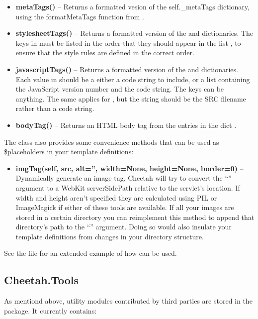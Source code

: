 \begin{itemize}
\item {\bf metaTags()} -- Returns a formatted vesion of the self.\_metaTags
     dictionary, using the formatMetaTags function from
     .
\item {\bf stylesheetTags()} -- Returns a formatted version of the
      and  dictionaries.
     The keys in  must be listed in the order that
     they should appear in the list , to ensure
     that the style rules are defined in the correct order.
\item {\bf javascriptTags()} -- Returns a formatted version of the
      and  dictionaries.
     Each value in  should be a either a code string
     to include, or a list containing the JavaScript version number and the code
     string. The keys can be anything.  The same applies for
     , but the string should be the SRC filename
     rather than a code string.
\item {\bf bodyTag()} -- Returns an HTML body tag from the entries in the dict
     .
\end{itemize}


The class also provides some convenience methods that can be used as
\$placeholders in your template definitions:

\begin{itemize}
\item {\bf imgTag(self, src, alt='', width=None, height=None, border=0)} --
     Dynamically generate an image tag.  Cheetah will try to convert the
     ``'' argument to a WebKit serverSidePath relative to the
     servlet's location. If width and height aren't specified they are
     calculated using PIL or ImageMagick if either of these tools are available.
     If all your images are stored in a certain directory you can reimplement
     this method to append that directory's path to the ``'' argument.
     Doing so would also insulate your template definitions from changes in your
     directory structure.
\end{itemize}

See the file 
for an extended example of how  can be used.

\subsection{Cheetah.Tools}
\label{libraries.tools}

As mentiond above, utility modules contributed by third parties are stored in
the  package. It currently contains:



